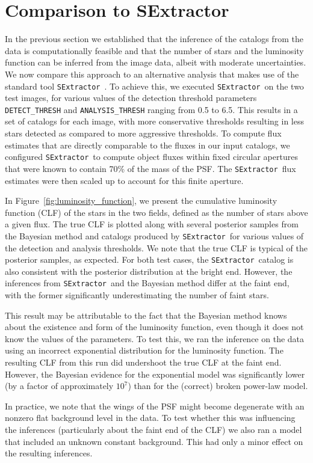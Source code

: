 \documentclass[12pt, preprint]{aastex}
\newcommand{\sex}{{\tt SExtractor}}
\begin{document}
\section{Comparison to SExtractor}\label{sec:sex}
In the previous section we established that the inference of the catalogs from
the data is computationally feasible and that the number of stars and the
luminosity function can be inferred from the image data, albeit with moderate
uncertainties. We now compare this approach to an alternative analysis that makes
use of the standard
tool \sex~\citep{sextractor}. To achieve this, we executed \sex~on the two test images, for various
values of the detection threshold parameters {\tt DETECT\_THRESH} and {\tt ANALYSIS\_THRESH}
ranging from 0.5 to 6.5. This results in a set of catalogs
for each image, with more conservative thresholds resulting in less stars detected
as compared to more aggressive thresholds. To compute flux
estimates that are directly comparable to the fluxes in our input catalogs, we
configured \sex~to compute object fluxes within fixed circular apertures that were
known to contain 70\% of the mass of the PSF. The \sex~flux estimates were then
scaled up to account for this finite aperture.

In Figure~\ref{fig:luminosity_function}, we present the cumulative luminosity
function (CLF) of the stars in the two fields, defined as the number of stars above
a given flux. The true CLF is plotted along with several
posterior samples from the Bayesian method and catalogs produced by \sex~for
various values of the detection and analysis thresholds.
We note that the true CLF is typical of the posterior samples, as expected.
For both test cases, the \sex~catalog is also consistent with the posterior
distribution at the bright end. However, the inferences from \sex~and the Bayesian
method differ at the faint end, with the former significantly underestimating
the number of faint stars.

This result may be attributable to the fact that the Bayesian method knows
about the existence and form of the luminosity function, even though it
does not know the values of the parameters. To test this, we ran the inference
on the data using an incorrect exponential distribution for the luminosity
function. The resulting CLF from this run did undershoot the true CLF
at the faint end.
However, the
Bayesian evidence for the exponential model was significantly lower (by a factor of
approximately $10^7$) than
for the (correct) broken power-law model.

In practice, we note that the wings of the PSF might become degenerate
with an nonzero flat background level in the data. To test whether this
was influencing the inferences (particularly about the faint end of the CLF)
we also ran a model that included an unknown constant background. This
had only a minor effect on the resulting inferences.
\end{document}
